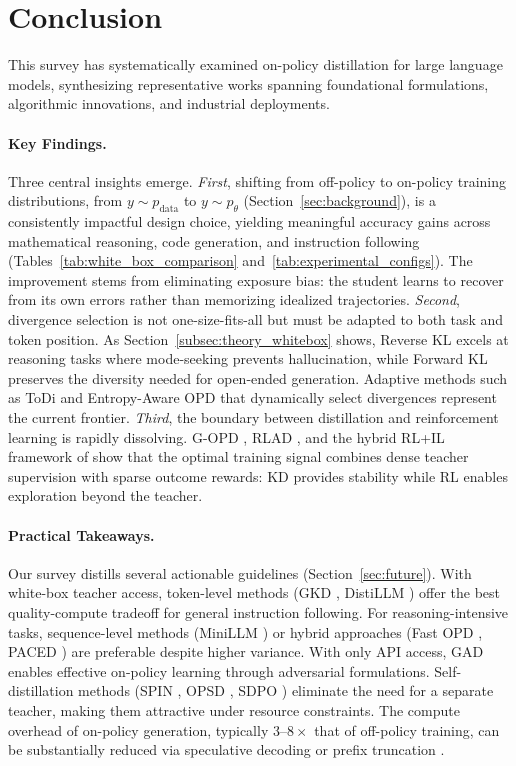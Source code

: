\documentclass{article} %
\newcommand{\ptheta}{p_\theta}
\newcommand{\pdata}{p_{\mathrm{data}}}
\begin{document}
\section{Conclusion}
\label{sec:conclusion}

This survey has systematically examined on-policy distillation for large language models, synthesizing representative works spanning foundational formulations, algorithmic innovations, and industrial deployments.

\paragraph{Key Findings.} Three central insights emerge. \emph{First}, shifting from off-policy to on-policy training distributions, from $y \sim \pdata$ to $y \sim \ptheta$ (Section~\ref{sec:background}), is a consistently impactful design choice, yielding meaningful accuracy gains across mathematical reasoning, code generation, and instruction following (Tables~\ref{tab:white_box_comparison} and~\ref{tab:experimental_configs}). The improvement stems from eliminating exposure bias: the student learns to recover from its own errors rather than memorizing idealized trajectories. \emph{Second}, divergence selection is not one-size-fits-all but must be adapted to both task and token position. As Section~\ref{subsec:theory_whitebox} shows, Reverse KL excels at reasoning tasks where mode-seeking prevents hallucination, while Forward KL preserves the diversity needed for open-ended generation. Adaptive methods such as ToDi \citep{2505.16297} and Entropy-Aware OPD \citep{2603.07079} that dynamically select divergences represent the current frontier. \emph{Third}, the boundary between distillation and reinforcement learning is rapidly dissolving. G-OPD \citep{2602.12125}, RLAD \citep{2602.22495}, and the hybrid RL+IL framework of \citet{2512.23097} show that the optimal training signal combines dense teacher supervision with sparse outcome rewards: KD provides stability while RL enables exploration beyond the teacher.

\paragraph{Practical Takeaways.} Our survey distills several actionable guidelines (Section~\ref{sec:future}). With white-box teacher access, token-level methods (GKD \citep{2306.13649}, DistiLLM \citep{2402.03898}) offer the best quality-compute tradeoff for general instruction following. For reasoning-intensive tasks, sequence-level methods (MiniLLM \citep{2306.08543}) or hybrid approaches (Fast OPD \citep{2602.15260}, PACED \citep{2603.11178}) are preferable despite higher variance. With only API access, GAD \citep{2511.10643} enables effective on-policy learning through adversarial formulations. Self-distillation methods (SPIN \citep{2401.01335}, OPSD \citep{2601.18734}, SDPO \citep{2601.20802}) eliminate the need for a separate teacher, making them attractive under resource constraints. The compute overhead of on-policy generation, typically $3\text{--}8\times$ that of off-policy training, can be substantially reduced via speculative decoding \citep{2410.11325} or prefix truncation \citep{2602.15260}.
\end{document}

